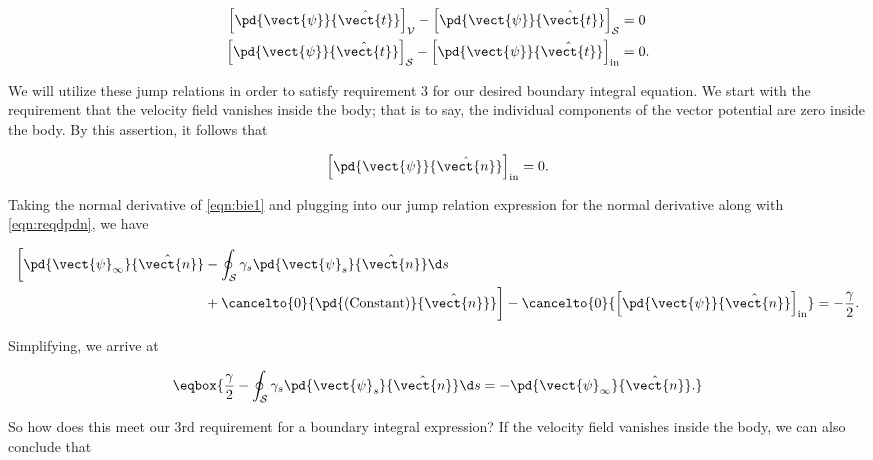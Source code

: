 \begin{subequations}
    \label{eqn:jumpdt}
\begin{align}
    \left[\pd{\vect{\psi}}{\hat{\vect{t}}}\right]_\mathcal{V} - \left[\pd{\vect{\psi}}{\hat{\vect{t}}}\right]_\mathcal{S} &= 0 \\
    \left[\pd{\vect{\psi}}{\hat{\vect{t}}}\right]_\mathcal{S} - \left[\pd{\vect{\psi}}{\hat{\vect{t}}}\right]_\text{in} &= 0.
\end{align}
\end{subequations}

We will utilize these jump relations in order to satisfy requirement 3 for our desired boundary integral equation.
%
We start with the requirement that the velocity field vanishes inside the body; that is to say, the individual components of the vector potential are zero inside the body.
%
By this assertion, it follows that

\begin{equation}
    \label{eqn:reqdpdn}
    \left[\pd{\vect{\psi}}{\hat{\vect{n}}}\right]_\text{in} = 0.
\end{equation}

\noindent Taking the normal derivative of \cref{eqn:bie1} and plugging into our jump relation expression for the normal derivative along with \cref{eqn:reqdpdn}, we have

\begin{equation}
    \begin{split}
        \bigg[\pd{\vect{\psi}_\infty}{\hat{\vect{n}}} & -   \oint_\mathcal{S} \gamma_s\pd{\vect{\psi}_s}{\hat{\vect{n}}} \d s \\
        &+ \cancelto{0}{\pd{\text{(Constant)}}{\hat{\vect{n}}}}\bigg] - \cancelto{0}{\left[\pd{\vect{\psi}}{\hat{\vect{n}}}\right]_\text{in}} = -\frac{\gamma}{2}.
    \end{split}
\end{equation}

\noindent Simplifying, we arrive at

\begin{equation}
    \label{eqn:bie2}
    \eqbox{
        \frac{\gamma}{2} -  \oint_\mathcal{S} \gamma_s \pd{\vect{\psi}_s}{\hat{\vect{n}}} \d s  = -\pd{\vect{\psi}_\infty}{\hat{\vect{n}}}.
}
\end{equation}

So how does this meet our 3rd requirement for a boundary integral expression?
%
If the velocity field vanishes inside the body, we can also conclude that

